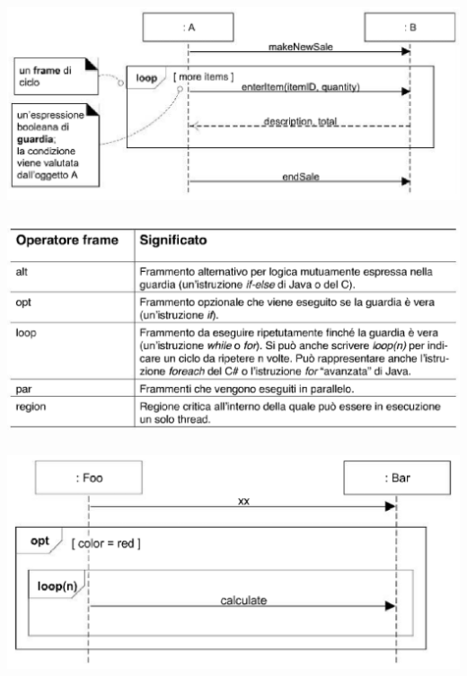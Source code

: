 \subsubsection{}

\begin{center}
    \includegraphics[scale=0.33]{images/Notazione SSD3.png}
\end{center}

\subsubsection{}

\begin{center}
    \includegraphics[scale=0.33]{images/Notazione SSD4.png}
\end{center}

\subsubsection{}

\begin{center}
    \includegraphics[scale=0.33]{images/Notazione SSD5.png}
\end{center}

